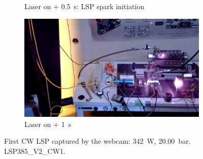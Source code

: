 \begin{figure}[!ht]
\begin{subfigure}[t]{0.45\textwidth}
        \caption{Laser on + \qty{0.5}{s}: LSP spark initiation}
        \label{fig:CW_V2_webcam_frames_LSP}
    \end{subfigure}
    \hfill
    \begin{subfigure}[t]{0.45\textwidth}
        \centering
        \includegraphics[width=\textwidth]{assets/4 experiments/CW LSP frames webcam/After LSP.png}
        \caption{Laser on + \qty{1}{s}}
    \end{subfigure}
    \caption{First CW LSP captured by the webcam: \qty{342}{W}, \qty{20.00}{bar}. LSP385\_V2\_CW1.}
    \label{fig:CW_V2_webcam_frames}
\end{figure}
